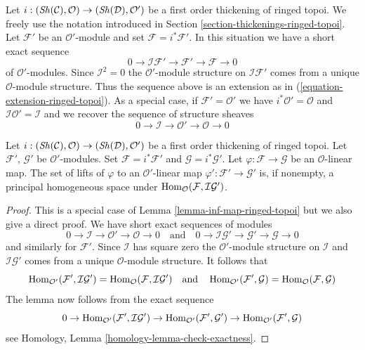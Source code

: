 \noindent
Let $i : (\mathop{\mathit{Sh}}\nolimits(\mathcal{C}), \mathcal{O}) \to (\mathop{\mathit{Sh}}\nolimits(\mathcal{D}), \mathcal{O}')$
be a first order thickening of ringed topoi. We freely use the notation
introduced in Section \ref{section-thickenings-ringed-topoi}.
Let $\mathcal{F}'$ be an $\mathcal{O}'$-module
and set $\mathcal{F} = i^*\mathcal{F}'$.
In this situation we have a short exact sequence
$$
0 \to \mathcal{I}\mathcal{F}' \to \mathcal{F}' \to \mathcal{F} \to 0
$$
of $\mathcal{O}'$-modules. Since $\mathcal{I}^2 = 0$ the
$\mathcal{O}'$-module structure on $\mathcal{I}\mathcal{F}'$
comes from a unique $\mathcal{O}$-module structure.
Thus the sequence above is an extension as in
(\ref{equation-extension-ringed-topoi}).
As a special case, if $\mathcal{F}' = \mathcal{O}'$ we have
$i^*\mathcal{O}' = \mathcal{O}$ and
$\mathcal{I}\mathcal{O}' = \mathcal{I}$ and we recover the
sequence of structure sheaves
$$
0 \to \mathcal{I} \to \mathcal{O}' \to \mathcal{O} \to 0
$$

\begin{lemma}
\label{lemma-inf-map-special-ringed-topoi}
Let $i : (\mathop{\mathit{Sh}}\nolimits(\mathcal{C}), \mathcal{O}) \to (\mathop{\mathit{Sh}}\nolimits(\mathcal{D}), \mathcal{O}')$
be a first order thickening of ringed topoi.
Let $\mathcal{F}'$, $\mathcal{G}'$ be $\mathcal{O}'$-modules.
Set $\mathcal{F} = i^*\mathcal{F}'$ and $\mathcal{G} = i^*\mathcal{G}'$.
Let $\varphi : \mathcal{F} \to \mathcal{G}$ be an $\mathcal{O}$-linear map.
The set of lifts of $\varphi$ to an $\mathcal{O}'$-linear map
$\varphi' : \mathcal{F}' \to \mathcal{G}'$ is, if nonempty, a principal
homogeneous space under
$\mathop{\mathrm{Hom}}\nolimits_\mathcal{O}(\mathcal{F}, \mathcal{I}\mathcal{G}')$.
\end{lemma}

\begin{proof}
This is a special case of Lemma \ref{lemma-inf-map-ringed-topoi} but we also
give a direct proof. We have short exact sequences of modules
$$
0 \to \mathcal{I} \to \mathcal{O}' \to \mathcal{O} \to 0
\quad\text{and}\quad
0 \to \mathcal{I}\mathcal{G}' \to \mathcal{G}' \to \mathcal{G} \to 0
$$
and similarly for $\mathcal{F}'$.
Since $\mathcal{I}$ has square zero the $\mathcal{O}'$-module
structure on $\mathcal{I}$ and $\mathcal{I}\mathcal{G}'$ comes from
a unique $\mathcal{O}$-module structure. It follows that
$$
\mathop{\mathrm{Hom}}\nolimits_{\mathcal{O}'}(\mathcal{F}', \mathcal{I}\mathcal{G}') =
\mathop{\mathrm{Hom}}\nolimits_\mathcal{O}(\mathcal{F}, \mathcal{I}\mathcal{G}')
\quad\text{and}\quad
\mathop{\mathrm{Hom}}\nolimits_{\mathcal{O}'}(\mathcal{F}', \mathcal{G}) =
\mathop{\mathrm{Hom}}\nolimits_\mathcal{O}(\mathcal{F}, \mathcal{G})
$$
The lemma now follows from the exact sequence
$$
0 \to \mathop{\mathrm{Hom}}\nolimits_{\mathcal{O}'}(\mathcal{F}', \mathcal{I}\mathcal{G}') \to
\mathop{\mathrm{Hom}}\nolimits_{\mathcal{O}'}(\mathcal{F}', \mathcal{G}') \to
\mathop{\mathrm{Hom}}\nolimits_{\mathcal{O}'}(\mathcal{F}', \mathcal{G})
$$
see Homology, Lemma \ref{homology-lemma-check-exactness}.
\end{proof}


